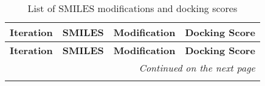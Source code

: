\documentclass{article}
\begin{document}
\begin{landscape}

\begin{longtable}{m{1.4cm} m{} m{} m{1.2cm}}  
\caption{List of SMILES modifications and docking scores} \label{tab:smiles} \\
\toprule
\textbf{Iteration} & \textbf{SMILES} & \textbf{Modification} & \textbf{Docking Score} \\
\midrule
\endfirsthead

\toprule
\textbf{Iteration} & \textbf{SMILES} & \textbf{Modification} & \textbf{Docking Score} \\
\midrule
\endhead

\midrule \multicolumn{4}{r}{\textit{Continued on the next page}} \\
\midrule
\endfoot

\bottomrule
\endlastfoot



\end{longtable}

\end{landscape}
\end{document}

